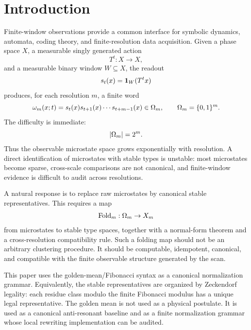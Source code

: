 \section{Introduction}
\label{sec:introduction}

Finite-window observations provide a common interface for symbolic dynamics, automata, coding theory, and finite-resolution data acquisition.  Given a phase space \(X\), a measurable singly generated action
\[
T^t:X\to X,
\]
and a measurable binary window \(W\subseteq X\), the readout
\[
s_t(x)=\mathbf{1}_W(T^t x)
\]
produces, for each resolution \(m\), a finite word
\[
\omega_m(x;t)=s_t(x)s_{t+1}(x)\cdots s_{t+m-1}(x)\in\Omega_m,
\qquad
\Omega_m=\{0,1\}^m.
\]
The difficulty is immediate:
\[
|\Omega_m|=2^m.
\]
Thus the observable microstate space grows exponentially with resolution.  A direct identification of microstates with stable types is unstable: most microstates become sparse, cross-scale comparisons are not canonical, and finite-window evidence is difficult to audit across resolutions.

A natural response is to replace raw microstates by canonical stable representatives.  This requires a map
\[
\operatorname{Fold}_m:\Omega_m\to X_m
\]
from microstates to stable type spaces, together with a normal-form theorem and a cross-resolution compatibility rule.  Such a folding map should not be an arbitrary clustering procedure.  It should be computable, idempotent, canonical, and compatible with the finite observable structure generated by the scan.

This paper uses the golden-mean/Fibonacci syntax as a canonical normalization grammar.  Equivalently, the stable representatives are organized by Zeckendorf legality: each residue class modulo the finite Fibonacci modulus has a unique legal representative.  The golden mean is not used as a physical postulate.  It is used as a canonical anti-resonant baseline and as a finite normalization grammar whose local rewriting implementation can be audited.

